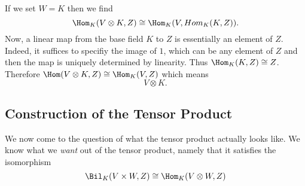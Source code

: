 \documentclass[12pt,oneside]{book}
\begin{document}
If we set \( W = K \) then we find
\begin{equation*}
	\Hom_K(V \otimes K, Z) \cong \Hom_K(V, Hom_K(K, Z)).
\end{equation*}
Now, a linear map from the base field \( K \) to \( Z \) is essentially an element of \( Z
\). Indeed, it suffices to specifiy the image of \( 1 \), which can be any element of \( Z
\) and then the map is uniquely determined by linearity. Thus \( \Hom_K(K, Z) \cong Z \).
Therefore \( \Hom(V \otimes K, Z) \cong \Hom_K(V, Z) \) which means
\begin{equation*}
	V \otimes K.
\end{equation*}

\subsection{Construction of the Tensor Product}
We now come to the question of what the tensor product actually looks like. We know what
we \emph{want} out of the tensor product, namely that it satisfies the isomorphism
\begin{equation*}
	\Bil_K(V \times W, Z) \cong \Hom_K(V \otimes W, Z)
\end{equation*}
\end{document}
